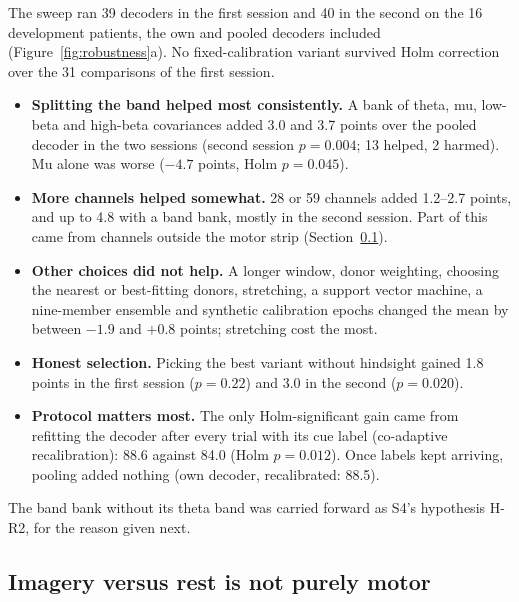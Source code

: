The sweep ran 39 decoders in the first session and 40 in the second on the 16 development patients, the own and pooled decoders included (Figure~\ref{fig:robustness}a). No fixed-calibration variant survived Holm correction over the 31 comparisons of the first session.
\begin{itemize}
  \item \textbf{Splitting the band helped most consistently.} A bank of theta, mu, low-beta and high-beta covariances added 3.0 and 3.7 points over the pooled decoder in the two sessions (second session $p = 0.004$; 13 helped, 2 harmed). Mu alone was worse ($-4.7$ points, Holm $p = 0.045$).
  \item \textbf{More channels helped somewhat.} 28 or 59 channels added 1.2--2.7 points, and up to 4.8 with a band bank, mostly in the second session. Part of this came from channels outside the motor strip (Section~\ref{sec:artifacts}).
  \item \textbf{Other choices did not help.} A longer window, donor weighting, choosing the nearest or best-fitting donors, stretching, a support vector machine, a nine-member ensemble and synthetic calibration epochs changed the mean by between $-1.9$ and $+0.8$ points; stretching cost the most.
  \item \textbf{Honest selection.} Picking the best variant without hindsight gained 1.8 points in the first session ($p = 0.22$) and 3.0 in the second ($p = 0.020$).
  \item \textbf{Protocol matters most.} The only Holm-significant gain came from refitting the decoder after every trial with its cue label (co-adaptive recalibration): 88.6\pct{} against 84.0\pct{} (Holm $p = 0.012$). Once labels kept arriving, pooling added nothing (own decoder, recalibrated: 88.5\pct{}).
\end{itemize}
The band bank without its theta band was carried forward as S4's hypothesis H-R2, for the reason given next.

\subsection{Imagery versus rest is not purely motor}
\label{sec:artifacts}

